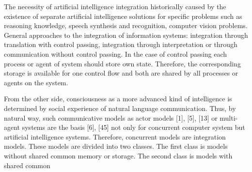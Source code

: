 \documentclass[10pt,twocolumn]{article}
\begin{document}
The necessity of artificial intelligence integration historically caused by the existence of separate artificial
intelligence solutions for specific problems such as reasoning knowledge, speech synthesis and recognition,
computer vision problems. General approaches to the
integration of information systems: integration through
translation with control passing, integration through interpretation or through communication without control
passing. In the case of control passing each process or
agent of system should store own state. Therefore, the
corresponding storage is available for one control flow
and both are shared by all processes or agents on the
system.


From the other side, consciousness as a more advanced
kind of intelligence is determined by social experience of
natural language communication. Thus, by natural way,
such communicative models as actor models [1], [5], [13]
or multi-agent systems are the basis [6], [45] not only
for concurrent computer system but artificial intelligence
systems. Therefore, concurrent models are integration
models. These models are divided into two classes. The
first class is models without shared common memory or
storage. The second class is models with shared common\vspace{5mm}
\end{document}
